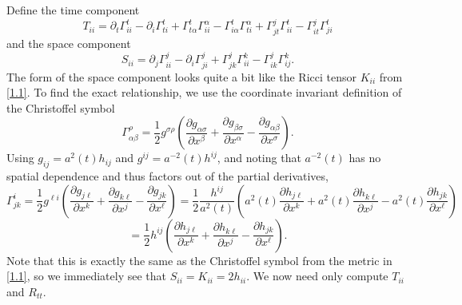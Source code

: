 \documentclass[11pt, letterpaper]{article}
\begin{document}
Define the time component
\[
	T_{ii} =\partial _t\Gamma ^t_{ii} -\partial _i\Gamma ^t_{ti} +\Gamma _{t\alpha } ^t\Gamma _{ii} ^\alpha -\Gamma ^t_{i\alpha } \Gamma ^\alpha _{ti}  + \Gamma ^j_{jt} \Gamma ^t_{ii} -\Gamma _{it} ^j\Gamma _{ji} ^t
\]
and the space component
\[
	S_{ii} =\partial _j\Gamma ^j_{ii} -\partial _i\Gamma ^j_{ji} +\Gamma ^j_{jk} \Gamma ^k_{ii} -\Gamma ^j_{ik} \Gamma ^k_{ij} 
.\]
The form of the space component looks quite a bit like the Ricci tensor $K_{ii} $ from \cref{1.1}. To find the exact relationship, we use the coordinate invariant definition of the Christoffel symbol
\[
	\Gamma^\rho _{\alpha \beta } =\frac{1}{2} g^{\sigma \rho } \left( \frac{\partial g_{\alpha \sigma } }{\partial x^\beta } +\frac{\partial g_{\beta \sigma } }{\partial x^\alpha } -\frac{\partial g_{\alpha \beta } }{\partial x^\sigma }  \right) 
.\]
Using $g_{ij} =a^2(t)h_{ij} $ and $g^{ij} =a^{-2} (t) h^{ij} $, and noting that $a^{-2} (t)$ has no spatial dependence and thus factors out of the partial derivatives,
\[
	\Gamma ^i_{jk} =\frac{1}{2} g^{\ell i} \left( \frac{\partial g_{j\ell } }{\partial x^k} +\frac{\partial g_{k\ell } }{\partial x^j} -\frac{\partial g_{jk} }{\partial x^\ell }  \right) =\frac{1}{2} \frac{h^{ij} }{a^2(t)} \left( a^2(t) \frac{\partial h_{j\ell } }{\partial x^k} +a^2(t) \frac{\partial h_{k\ell } }{\partial x^j} -a^2(t) \frac{\partial h_{jk} }{\partial x^\ell }  \right) 	
\]
\[
	=\frac{1}{2} h^{ij} \left( \frac{\partial h_{j\ell } }{\partial x^k} +\frac{\partial h_{k\ell } }{\partial x^j} -\frac{\partial h_{jk} }{\partial x^\ell }  \right) 
.\]
Note that this is exactly the same as the Christoffel symbol from the metric in \cref{1.1}, so we immediately see that $S_{ii} =K_{ii} =2h_{ii} $. We now need only compute $T_{ii} $ and $R_{tt} $.
\end{document}

